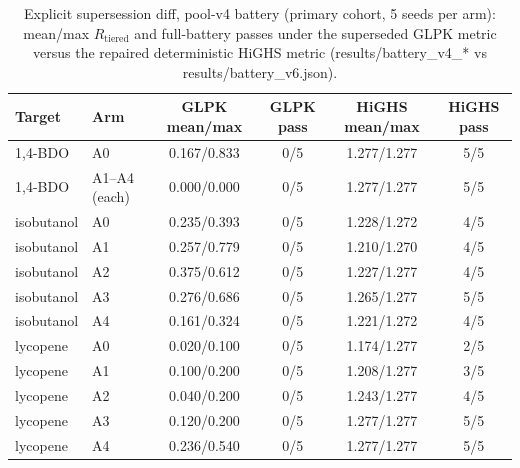 \documentclass[12pt,a4paper]{article}
\begin{document}
\begin{table}[htbp]
\centering\small
\caption{Explicit supersession diff, pool-v4 battery (primary cohort, 5 seeds per arm): mean/max $R_{\mathrm{tiered}}$ and full-battery passes under the superseded GLPK metric versus the repaired deterministic HiGHS metric (results/battery\_v4\_* vs results/battery\_v6.json).}
\label{tab:supersession}
\begin{tabular}{llcccc}
\hline
Target & Arm & GLPK mean/max & GLPK pass & HiGHS mean/max & HiGHS pass \\
\hline
1,4-BDO & A0 & 0.167/0.833 & 0/5 & 1.277/1.277 & 5/5 \\
1,4-BDO & A1--A4 (each) & 0.000/0.000 & 0/5 & 1.277/1.277 & 5/5 \\
isobutanol & A0 & 0.235/0.393 & 0/5 & 1.228/1.272 & 4/5 \\
isobutanol & A1 & 0.257/0.779 & 0/5 & 1.210/1.270 & 4/5 \\
isobutanol & A2 & 0.375/0.612 & 0/5 & 1.227/1.277 & 4/5 \\
isobutanol & A3 & 0.276/0.686 & 0/5 & 1.265/1.277 & 5/5 \\
isobutanol & A4 & 0.161/0.324 & 0/5 & 1.221/1.272 & 4/5 \\
lycopene & A0 & 0.020/0.100 & 0/5 & 1.174/1.277 & 2/5 \\
lycopene & A1 & 0.100/0.200 & 0/5 & 1.208/1.277 & 3/5 \\
lycopene & A2 & 0.040/0.200 & 0/5 & 1.243/1.277 & 4/5 \\
lycopene & A3 & 0.120/0.200 & 0/5 & 1.277/1.277 & 5/5 \\
lycopene & A4 & 0.236/0.540 & 0/5 & 1.277/1.277 & 5/5 \\
\hline
\end{tabular}
\end{table}
\end{document}
